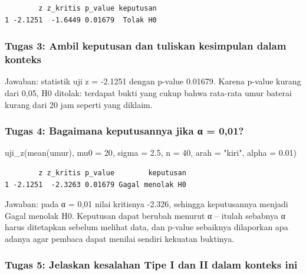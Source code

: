 \documentclass[
  indonesian,
  letterpaper,
]{book}
\newenvironment{Shaded}{\begin{snugshade}}{\end{snugshade}}
\newcommand{\AttributeTok}[1]{\textcolor[rgb]{0.40,0.45,0.13}{#1}}
\newcommand{\DecValTok}[1]{\textcolor[rgb]{0.68,0.00,0.00}{#1}}
\newcommand{\FloatTok}[1]{\textcolor[rgb]{0.68,0.00,0.00}{#1}}
\newcommand{\FunctionTok}[1]{\textcolor[rgb]{0.28,0.35,0.67}{#1}}
\newcommand{\NormalTok}[1]{\textcolor[rgb]{0.00,0.23,0.31}{#1}}
\newcommand{\StringTok}[1]{\textcolor[rgb]{0.13,0.47,0.30}{#1}}
\begin{document}
\begin{verbatim}
        z z_kritis p_value keputusan
1 -2.1251  -1.6449 0.01679  Tolak H0
\end{verbatim}

\subsubsection{Tugas 3: Ambil keputusan dan tuliskan kesimpulan dalam
konteks}\label{tugas-3-ambil-keputusan-dan-tuliskan-kesimpulan-dalam-konteks}

Jawaban: statistik uji z = -2.1251 dengan p-value 0.01679. Karena
p-value kurang dari 0,05, H0 ditolak: terdapat bukti yang cukup bahwa
rata-rata umur baterai kurang dari 20 jam seperti yang diklaim.

\subsubsection{Tugas 4: Bagaimana keputusannya jika α =
0,01?}\label{tugas-4-bagaimana-keputusannya-jika-ux3b1-001}

\begin{Shaded}
\begin{Highlighting}[]
\FunctionTok{uji\_z}\NormalTok{(}\FunctionTok{mean}\NormalTok{(umur), }\AttributeTok{mu0 =} \DecValTok{20}\NormalTok{, }\AttributeTok{sigma =} \FloatTok{2.5}\NormalTok{, }\AttributeTok{n =} \DecValTok{40}\NormalTok{, }\AttributeTok{arah =} \StringTok{"kiri"}\NormalTok{, }\AttributeTok{alpha =} \FloatTok{0.01}\NormalTok{)}
\end{Highlighting}
\end{Shaded}

\begin{verbatim}
        z z_kritis p_value        keputusan
1 -2.1251  -2.3263 0.01679 Gagal menolak H0
\end{verbatim}

Jawaban: pada α = 0,01 nilai kritisnya -2.326, sehingga keputusannya
menjadi Gagal menolak H0. Keputusan dapat berubah menurut α -- itulah
sebabnya α harus ditetapkan sebelum melihat data, dan p-value sebaiknya
dilaporkan apa adanya agar pembaca dapat menilai sendiri kekuatan
buktinya.

\subsubsection{Tugas 5: Jelaskan kesalahan Tipe I dan II dalam konteks
ini}\label{tugas-5-jelaskan-kesalahan-tipe-i-dan-ii-dalam-konteks-ini}
\end{document}
